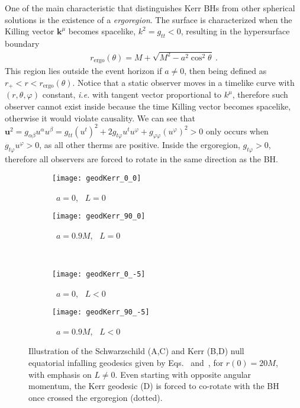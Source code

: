 One of the main characteristic that distinguishes Kerr BHs from other spherical solutions is the existence of a \emph{ergoregion}.
The surface is characterized when the Killing vector $\bm{k}^\mu$ becomes spacelike, $k^2=g_{tt}<0$, resulting in the hypersurface boundary
\begin{align}
    r_{\mathrm{ergo}}(\theta) = M + \sqrt{M^2 - a^2 \cos^2\theta} ~.
    \label{eq2:KerrErgo}
\end{align}
This region lies outside the event horizon if $a\ne0$, then being defined as $r_+< r < r_{\mathrm{ergo}}(\theta)$.
Notice that a static observer moves in a timelike curve with $(r,\theta,\varphi)$ constant, \emph{i.e.} with tangent vector proportional to $k^\mu$, therefore such observer cannot exist inside because the time Killing vector becomes spacelike, otherwise it would violate causality. We can see that $\bm{u}^2=g_{\alpha\beta}u^\alpha u^\beta = g_{tt} (u^t)^2 + 2 g_{t\varphi} u^t u^\varphi +  g_{\varphi\varphi} (u^\varphi)^2 > 0$ only occurs when $g_{t\varphi} u^\varphi > 0$, as all other therms are positive. Inside the ergoregion, $g_{t\varphi}>0$, therefore all observers are forced to rotate in the same direction as the BH.

\begin{figure}[h]
    \centering
    \vspace{0.5cm}
    \begin{subfigure}[c]{0.4\textwidth}
        \texttt{[image: geodKerr\_0\_0]}
        \caption{ ~$a=0$, ~$L=0$}
    \end{subfigure}
    \hspace{1cm}
    \begin{subfigure}[c]{0.4\textwidth}
        \texttt{[image: geodKerr\_90\_0]}
        \caption{~$a=0.9 M$, ~$L=0$}
    \end{subfigure}
    \\
    \vspace{0.3cm}
    \begin{subfigure}[c]{0.4\textwidth}
        \texttt{[image: geodKerr\_0\_-5]}
        \caption{~$a=0$, ~$L<0$}
    \end{subfigure}
    \hspace{1cm}
    \begin{subfigure}[c]{0.4\textwidth}
        \texttt{[image: geodKerr\_90\_-5]}
        \caption{~$a=0.9 M$, ~$L<0$}
    \end{subfigure}
    \caption{Illustration of the Schwarzschild ({\footnotesize\textsc{A,C}}) and Kerr ({\footnotesize\textsc{B,D}}) null equatorial infalling geodesics given by Eqs.~ and~, for $r(0)=20 M$, with emphasis on $L\ne0$. Even starting with opposite angular momentum, the Kerr geodesic ({\footnotesize\textsc{D}}) is forced to co-rotate with the BH once crossed the ergoregion (dotted).}
    \label{fig2:geodesics}
\end{figure}

